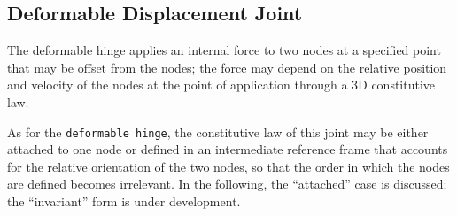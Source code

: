 \documentclass[10pt,dvips,fleqn]{report}
\begin{document}
\subsection{Deformable Displacement Joint}
The deformable hinge applies an internal force to two nodes at a specified 
point that may be offset from the nodes; the force may depend on the relative
position and velocity of the nodes at the point of application
through a 3D constitutive law.

As for the \texttt{deformable hinge}, the constitutive law of this joint
may be either attached to one node or defined in an intermediate
reference frame that accounts for the relative orientation of the two nodes,
so that the order in which the nodes are defined becomes irrelevant.
In the following, the ``attached'' case is discussed; the ``invariant''
form is under development.
\end{document}

